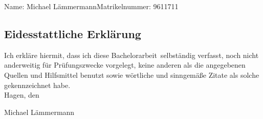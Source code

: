 \documentclass[twoside,bibliography=totoc,openany,numbers=noenddot]{fumi}
\newcommand{\thesisauthor}{Michael Lämmermann}
\newcommand{\thesistype}{Bachelorarbeit} %
\newcommand{\thesismatrikelnummer}{9611711}
\begin{document}
\cleardoublepage


Name: \thesisauthor \hfill Matrikelnummer: \thesismatrikelnummer \vspace{2cm}
\subsection*{Eidesstattliche Erklärung}
Ich erkläre hiermit, dass ich diese \thesistype~selbständig verfasst, noch nicht anderweitig für Prüfungszwecke vorgelegt, keine anderen als die angegebenen Quellen und Hilfsmittel benutzt sowie wörtliche und sinngemäße Zitate als solche gekennzeichnet habe.\\[1cm]
Hagen, den \dotfill

\hspace{2cm}{\footnotesize Datum}\hspace{5cm} {\footnotesize \thesisauthor}
\end{document}
